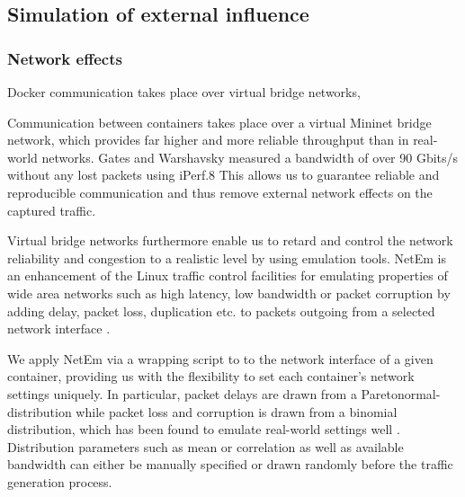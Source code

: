 \documentclass[runningheads]{llncs}
\begin{document}



\subsection{Simulation of external influence}

\subsubsection*{Network effects}

Docker communication takes place over virtual bridge networks, 

Communication between containers takes place over a virtual Mininet bridge network, which provides far higher and more reliable throughput than in real-world networks. Gates and Warshavsky \cite{iperf} measured a bandwidth of over 90 Gbits/s without any lost packets using iPerf.8 This allows us to guarantee reliable and reproducible communication and thus remove external network effects on the captured traffic.

Virtual bridge networks furthermore enable us to retard and control the network reliability and congestion to a realistic level by using emulation tools. NetEm is an enhancement of the Linux traffic control facilities for emulating properties of wide area networks such as high latency, low bandwidth or packet corruption by adding delay, packet loss, duplication etc. to packets outgoing from a selected network interface \cite{hemminger2005network}.

We apply NetEm via a wrapping script to to the network interface of a given container, providing us with the flexibility to set each container's network settings uniquely. In particular, packet delays are drawn from a Paretonormal-distribution while packet loss and corruption is drawn from a binomial distribution, which has been found to emulate real-world settings well \cite{jurgelionis2011empirical}. Distribution parameters such as mean or correlation as well as available bandwidth can either be manually specified or drawn randomly before the traffic generation process.

\end{document}
